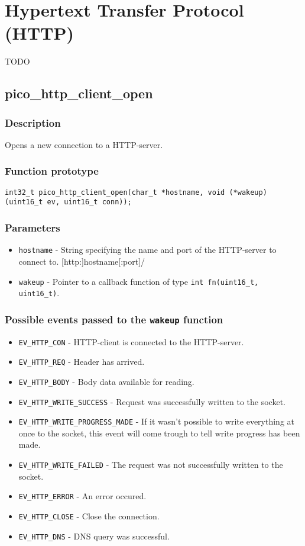 \section{Hypertext Transfer Protocol (HTTP)}
TODO

\subsection{pico\_http\_client\_open}

\subsubsection*{Description}
Opens a new connection to a HTTP-server.

\subsubsection*{Function prototype}
\texttt{int32\_t pico\_http\_client\_open(char\_t *hostname,
                void (*wakeup)(uint16\_t ev, uint16\_t conn));}

\subsubsection*{Parameters}
\begin{itemize}[noitemsep]
\item \texttt{hostname} - String specifying the name and port of the HTTP-server to connect to. [http:]hostname[:port]/
\item \texttt{wakeup} - Pointer to a callback function of type \texttt{int fn(uint16\_t, uint16\_t)}.
\end{itemize}

\subsubsection*{Possible events passed to the \texttt{wakeup} function}
\begin{itemize}[noitemsep]
\item \texttt{EV\_HTTP\_CON} - HTTP-client is connected to the HTTP-server.
\item \texttt{EV\_HTTP\_REQ} - Header has arrived.
\item \texttt{EV\_HTTP\_BODY} - Body data available for reading.
\item \texttt{EV\_HTTP\_WRITE\_SUCCESS} - Request was successfully written to the socket.
\item \texttt{EV\_HTTP\_WRITE\_PROGRESS\_MADE} - If it wasn't possible to write everything at once to the socket, this event will come trough to tell write progress has been made.
\item \texttt{EV\_HTTP\_WRITE\_FAILED} - The request was not successfully written to the socket.
\item \texttt{EV\_HTTP\_ERROR} - An error occured.
\item \texttt{EV\_HTTP\_CLOSE} - Close the connection.
\item \texttt{EV\_HTTP\_DNS} - DNS query was successful.
\end{itemize}
